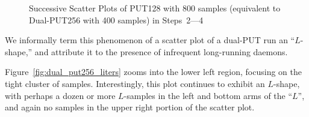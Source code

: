 \documentclass[letter]{ieice}
\begin{document}
{\begin{figure}[ht]
	\centering
	\vspace{-0.15in}
    \caption{Successive Scatter Plots of PUT128 with 800 samples 
    (equivalent to Dual-PUT256 with 400 samples) in Steps~2---4~\label{fig:put128_plot}} 
    \vspace{-0.3in}     
\end{figure} 

We informally term this phenomenon of a scatter plot of a dual-PUT run an
``$L$-shape,'' and attribute it to the
presence of infrequent long-running daemons.

Figure~\ref{fig:dual_put256_liters} zooms into the lower left region,
focusing on the
tight cluster of samples.  Interestingly, this plot continues to exhibit an
$L$-shape, with perhaps a dozen or more $L$-samples in the left and bottom arms of
the ``$L$'', and again no samples in the upper right portion of the
scatter plot.

}
\end{document}
